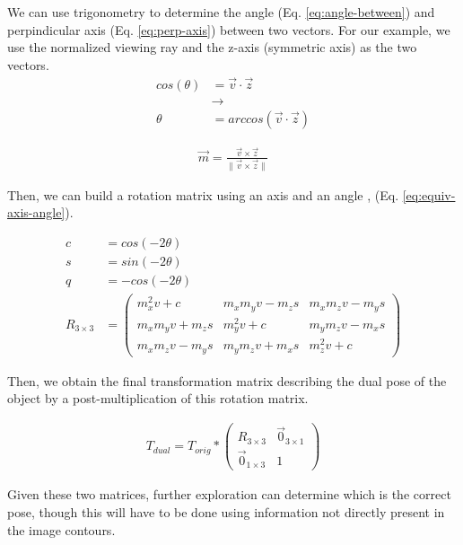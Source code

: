 We can use trigonometry to determine the angle (Eq. \ref{eq:angle-between}) and perpindicular axis (Eq. \ref{eq:perp-axis}) between two vectors. For our example, we use the normalized viewing ray and the z-axis (symmetric axis) as the two vectors.
\begin{equation}
    \begin{aligned}
        cos(\theta) &= \vec{v} \cdot \vec{z} \\
        &\rightarrow \\
        \theta &= arccos(\vec{v} \cdot \vec{z})
    \end{aligned}
    \label{eq:angle-between}
\end{equation}

\begin{equation}
    \begin{aligned}
        \vec{m} = \frac{\vec{v} \times \vec{z}}{\|\vec{v} \times \vec{z}\|}
    \end{aligned}
    \label{eq:perp-axis}
\end{equation}

Then, we can build a rotation matrix using an axis and an angle \cite{craneKinematicAnalysisRobot2008}, (Eq. \ref{eq:equiv-axis-angle}).

\begin{equation}
    \begin{aligned}
        c &= cos(-2\theta)\\
        s &= sin(-2\theta) \\
        q &= -cos(-2\theta)\\
        R_{3 \times 3} &= \begin{pmatrix}
            m_x^2v + c & m_xm_yv - m_zs & m_x m_z v - m_y s \\ m_x m_y v + m_z s & m_y^2 v + c & m_y m_z v - m_x s \\ m_x m_z v - m_y s & m_y m_z v + m_x s & m_z^2 v + c
        \end{pmatrix}
    \end{aligned}
    \label{eq:equiv-axis-angle}
\end{equation}

Then, we obtain the final transformation matrix describing the dual pose of the object by a post-multiplication of this rotation matrix.

\begin{equation}
    \begin{aligned}
        T_{dual} = T_{orig} * \begin{pmatrix}
            R_{3 \times 3} & \vec{0}_{3 \times 1} \\ \vec{0}_{1 \times 3} & 1
        \end{pmatrix}
    \end{aligned}
    \label{eq:rotation-matrix-mult}
\end{equation}

Given these two matrices, further exploration can determine which is the correct pose, though this will have to be done using information not directly present in the image contours.